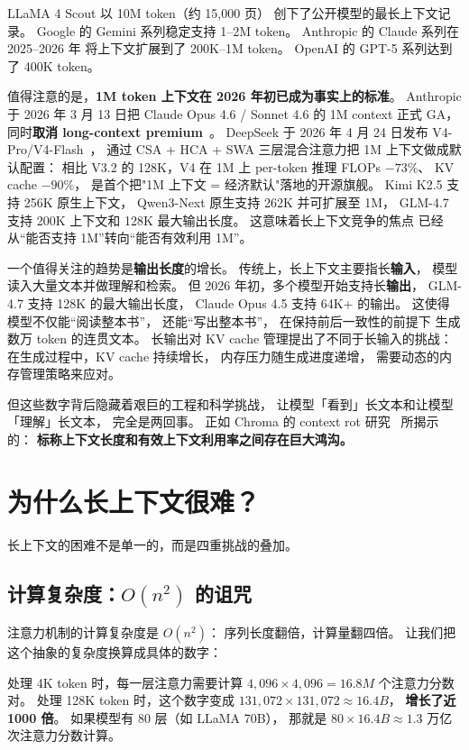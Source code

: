 LLaMA 4 Scout 以 10M token（约 15,000 页）
创下了公开模型的最长上下文记录。
Google 的 Gemini 系列稳定支持 1--2M token。
Anthropic 的 Claude 系列在 2025--2026 年
将上下文扩展到了 200K--1M token。
OpenAI 的 GPT-5 系列达到了 400K token。

值得注意的是，\textbf{1M token 上下文在 2026 年初已成为事实上的标准}。
Anthropic 于 2026 年 3 月 13 日把 Claude Opus 4.6 / Sonnet 4.6 的 1M context
正式 GA，同时\textbf{取消 long-context premium}~\cite{anthropic2026context1m}。
DeepSeek 于 2026 年 4 月 24 日发布 V4-Pro/V4-Flash~\cite{deepseekv4}，
通过 CSA + HCA + SWA 三层混合注意力把 1M 上下文做成默认配置：
相比 V3.2 的 128K，V4 在 1M 上 per-token 推理 FLOPs $-73\%$、
KV cache $-90\%$，
是首个把"1M 上下文 = 经济默认"落地的开源旗舰。
Kimi K2.5 支持 256K 原生上下文，
Qwen3-Next 原生支持 262K 并可扩展至 1M，
GLM-4.7 支持 200K 上下文和 128K 最大输出长度。
这意味着长上下文竞争的焦点
已经从“能否支持 1M”转向“能否有效利用 1M”。

一个值得关注的趋势是\textbf{输出长度}的增长。
传统上，长上下文主要指长\textbf{输入}，
模型读入大量文本并做理解和检索。
但 2026 年初，多个模型开始支持长\textbf{输出}，
GLM-4.7 支持 128K 的最大输出长度，
Claude Opus 4.5 支持 64K+ 的输出。
这使得模型不仅能“阅读整本书”，
还能“写出整本书”，
在保持前后一致性的前提下
生成数万 token 的连贯文本。
长输出对 KV cache 管理提出了不同于长输入的挑战：
在生成过程中，KV cache 持续增长，
内存压力随生成进度递增，
需要动态的内存管理策略来应对。

但这些数字背后隐藏着艰巨的工程和科学挑战，
让模型「看到」长文本和让模型「理解」长文本，
完全是两回事。
正如 Chroma 的 context rot 研究~\cite{chroma2025contextrot} 所揭示的：
\textbf{标称上下文长度和有效上下文利用率之间存在巨大鸿沟。}

\section{为什么长上下文很难？}

长上下文的困难不是单一的，而是四重挑战的叠加。

\subsection{计算复杂度：$O(n^2)$ 的诅咒}

注意力机制的计算复杂度是 $O(n^2)$：
序列长度翻倍，计算量翻四倍。
让我们把这个抽象的复杂度换算成具体的数字：

处理 4K token 时，每一层注意力需要计算
$4{,}096 \times 4{,}096 = 16.8M$ 个注意力分数对。
处理 128K token 时，这个数字变成
$131{,}072 \times 131{,}072 \approx 16.4B$，
\textbf{增长了近 1000 倍}。
如果模型有 80 层（如 LLaMA 70B），
那就是 $80 \times 16.4B \approx 1.3$ 万亿次注意力分数计算。

